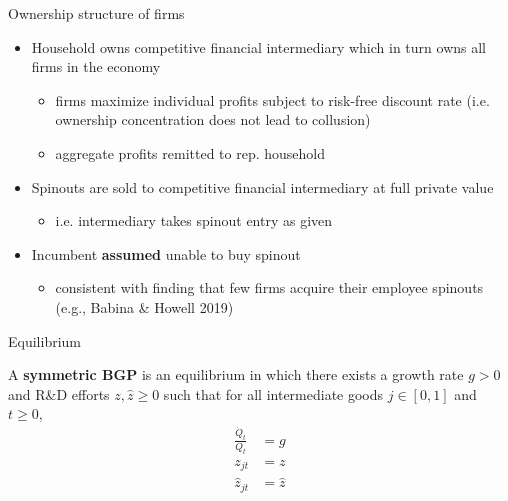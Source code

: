 \documentclass[english,usenames,dvipsnames]{beamer}
\begin{document}
\begin{frame}{Ownership structure of firms}
	\begin{itemize}
		\item Household owns competitive financial intermediary which in turn owns all firms in the economy
		\begin{itemize}
			\item firms maximize individual profits subject to risk-free discount rate (i.e. ownership concentration does not lead to collusion)
			\item aggregate profits remitted to rep. household
		\end{itemize}
		\medskip
		\item Spinouts are sold to competitive financial intermediary at full private value
		\begin{itemize}
			\item i.e. intermediary takes spinout entry as given
		\end{itemize}
		\medskip
		\item Incumbent \alert{\textbf{assumed}} unable to buy spinout 
		\begin{itemize}
			\item consistent with finding that few firms acquire their employee spinouts (e.g., Babina \& Howell 2019)
		\end{itemize}
	\end{itemize}
\end{frame}

\begin{frame}{Equilibrium}\label{definition:symmetric_bgp}
	\hyperlink{definition:equilibrium}{}
	\begin{definition}
		A \textbf{symmetric BGP} is an equilibrium in which there exists a growth rate $g > 0$ and R\&D efforts $z,\hat{z} \ge 0$ such that for all intermediate goods $j \in [0,1]$ and $t \ge 0$, 
		\begin{align*}
			\frac{\dot{Q}_t}{Q_t} &= g \\
			z_{jt} &= z \\
			\hat{z}_{jt} &= \hat{z}
		\end{align*}
	\end{definition}
\end{frame}
\end{document}
